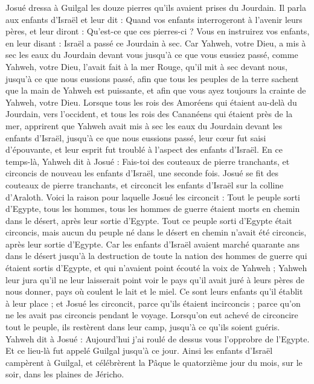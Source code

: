 \begin{multicols}{2}
Josué dressa à Guilgal les douze pierres qu’ils avaient prises du Jourdain.
Il parla aux enfants d’Israël et leur dit : Quand vos enfants interrogeront à l’avenir leurs pères, et leur diront : Qu’est-ce que ces pierres-ci ?
Vous en instruirez vos enfants, en leur disant : Israël a passé ce Jourdain à sec.
Car Yahweh, votre Dieu, a mis à sec les eaux du Jourdain devant vous jusqu’à ce que vous eussiez passé, comme Yahweh, votre Dieu, l’avait fait à la mer Rouge, qu’il mit à sec devant nous, jusqu’à ce que nous eussions passé,
afin que tous les peuples de la terre sachent que la main de Yahweh est puissante, et afin que vous ayez toujours la crainte de Yahweh, votre Dieu.
\VerseOne{}Lorsque tous les rois des Amoréens qui étaient au-delà du Jourdain, vers l’occident, et tous les rois des Cananéens qui étaient près de la mer, apprirent que Yahweh avait mis à sec les eaux du Jourdain devant les enfants d’Israël, jusqu’à ce que nous eussions passé, leur cœur fut saisi d’épouvante, et leur esprit fut troublé à l’aspect des enfants d’Israël.
En ce temps-là, Yahweh dit à Josué : Fais-toi des couteaux de pierre tranchants, et\FTNT{} circoncis de nouveau les enfants d’Israël, une seconde fois.
Josué se fit des couteaux de pierre tranchants, et circoncit les enfants d’Israël sur la colline d’Araloth.
Voici la raison pour laquelle Josué les circoncit : Tout le peuple sorti d’Egypte, tous les hommes, tous les hommes de guerre étaient morts en chemin dans le désert, après leur sortie d’Egypte.
Tout ce peuple sorti d’Egypte était circoncis, mais aucun du peuple né dans le désert en chemin n’avait été circoncis, après leur sortie d’Egypte.
Car les enfants d’Israël avaient marché quarante ans dans le désert jusqu’à la destruction de toute la nation des hommes de guerre qui étaient sortis d’Egypte, et qui n’avaient point écouté la voix de Yahweh ; Yahweh leur jura qu’il ne leur laisserait point voir le pays qu’il avait juré à leurs pères de nous donner, pays où coulent le lait et le miel.
Ce sont leurs enfants qu’il établit à leur place ; et Josué les circoncit, parce qu’ils étaient incirconcis ; parce qu’on ne les avait pas circoncis pendant le voyage.
Lorsqu’on eut achevé de circoncire tout le peuple, ils restèrent dans leur camp, jusqu’à ce qu’ils soient guéris.
Yahweh dit à Josué : Aujourd’hui j’ai roulé de dessus vous l’opprobre de l’Egypte. Et ce lieu-là fut appelé Guilgal jusqu’à ce jour.
Ainsi les enfants d’Israël campèrent à Guilgal, et célébrèrent la Pâque le quatorzième jour du mois, sur le soir, dans les plaines de Jéricho.

\end{multicols}
